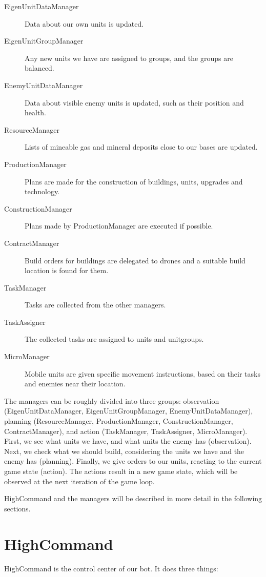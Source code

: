\begin{description}
\item[EigenUnitDataManager] Data about our own units is updated.
\item[EigenUnitGroupManager] Any new units we have are assigned to groups, and the groups are balanced.
\item[EnemyUnitDataManager] Data about visible enemy units is updated, such as their position and health.
\item[ResourceManager] Lists of mineable gas and mineral deposits close to our bases are updated.
\item[ProductionManager] Plans are made for the construction of buildings, units, upgrades and technology.
\item[ConstructionManager] Plans made by ProductionManager are executed if possible.
\item[ContractManager] Build orders for buildings are delegated to drones and a suitable build location is found for them.
\item[TaskManager] Tasks are collected from the other managers.
\item[TaskAssigner] The collected tasks are assigned to units and unitgroups.
\item[MicroManager] Mobile units are given specific movement instructions, based on their tasks and enemies near their location.
\end{description}

The managers can be roughly divided into three groups: observation (Eigen\-Unit\-Data\-Manager, Eigen\-Unit\-Group\-Manager, Enemy\-Unit\-Data\-Manager), planning (Resource\-Manager, Production\-Manager, Construction\-Manager, Contract\-Manager), and action (Task\-Manager, Task\-Assigner, Micro\-Manager). First, we see what units we have, and what units the enemy has (observation). Next, we check what we should build, considering the units we have and the enemy has (planning). Finally, we give orders to our units, reacting to the current game state (action). The actions result in a new game state, which will be observed at the next iteration of the game loop.

HighCommand and the managers will be described in more detail in the following sections.

\section{HighCommand}

HighCommand is the control center of our bot. It does three things:

